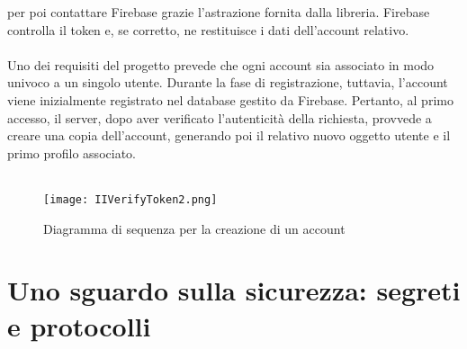 per poi contattare Firebase grazie l'astrazione fornita dalla libreria.
Firebase controlla il token e, se corretto,
ne restituisce i dati dell'account relativo.\\
\\
Uno dei requisiti del progetto prevede 
che ogni account sia associato in modo univoco a un singolo utente. 
Durante la fase di registrazione, tuttavia, 
l’account viene inizialmente registrato nel database gestito da Firebase. 
Pertanto, al primo accesso, il server, dopo aver verificato l’autenticità della richiesta, 
provvede a creare una copia dell’account, 
generando poi il relativo nuovo oggetto utente e il primo profilo associato.\\
\\
\begin{figure}[h!]
    \centering
    \texttt{[image: IIVerifyToken2.png]}
    \caption{Diagramma di sequenza per la creazione di un account}
\end{figure}
\clearpage
\section{Uno sguardo sulla sicurezza: segreti e protocolli}

